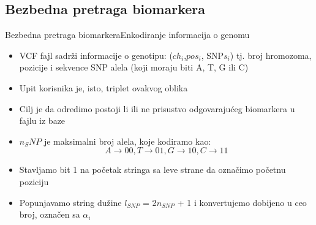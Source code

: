 \documentclass[10pt]{beamer}
\begin{document}
\subsection{Bezbedna pretraga biomarkera}
\begin{frame}{Bezbedna pretraga biomarkera}{Enkodiranje informacija o genomu}
\begin{block}{}
\begin{itemize}
\item VCF fajl sadrži informacije o genotipu: ($ch_i$,$pos_i$, SNP$s_i$) tj. broj hromozoma, pozicije i sekvence SNP alela (koji moraju biti A, T, G ili C)
\item Upit korisnika je, isto, triplet ovakvog oblika 
\item Cilj je da odredimo postoji li ili ne prisustvo odgovarajućeg biomarkera u fajlu iz baze
\item $n_SNP$ je maksimalni broj alela, koje kodiramo kao: $$A \rightarrow 00, T \rightarrow 01, G \rightarrow 10, C \rightarrow 11$$
\item Stavljamo bit 1 na početak stringa sa leve strane da označimo početnu poziciju
\item Popunjavamo string dužine $\textit{l}_{SNP}$ = 2$n_{SNP}$ + 1 i konvertujemo dobijeno u ceo broj, označen sa $\alpha_i$
\end{itemize}
\end{block}
\end{frame}

  
\end{document}

